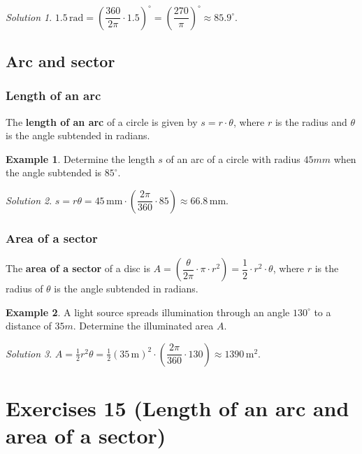 \documentclass[
  english,
  12pt,
  oneside]{book}
\theoremstyle{definition}
\theoremstyle{definition}
\newtheorem{example}{Example}[chapter]
\theoremstyle{definition}
\theoremstyle{definition}
\theoremstyle{remark}
\newtheorem*{solution}{Solution}
\begin{document}
\begin{solution}
\(1.5\,\mathrm{rad} = \left(\dfrac{360}{2\pi}\cdot 1.5\right)^\circ = \left(\dfrac{270}{\pi}\right)^\circ \approx 85.9^\circ\).
\end{solution}

\section{Arc and sector}\label{arc-and-sector}

\subsection{Length of an arc}\label{length-of-an-arc}

The \textbf{length of an arc} of a circle is given by \(s=r\cdot\theta\), where \(r\) is the radius and \(\theta\) is the angle subtended in radians.

\begin{example}
Determine the length \(s\) of an arc of a circle with radius \(45mm\) when the angle subtended is \(85^\circ\).
\end{example}

\begin{solution}
\(s=r\theta = 45\,\mathrm{mm}\cdot\left(\dfrac{2\pi}{360}\cdot 85\right) \approx 66.8\,\mathrm{mm}\).
\end{solution}

\subsection{Area of a sector}\label{area-of-a-sector}

The \textbf{area of a sector} of a disc is \(A=\left(\dfrac{\theta}{2\pi}\cdot\pi\cdot r^2\right) = \dfrac{1}{2}\cdot r^2\cdot \theta\), where \(r\) is the radius of \(\theta\) is the angle subtended in radians.

\begin{example}
A light source spreads illumination through an angle \(130^\circ\) to a distance of \(35m\). Determine the illuminated area \(A\).
\end{example}

\begin{solution}
\(A=\frac12 r^2\theta = \frac12\left(35\,\mathrm{m}\right)^2\cdot\left(\dfrac{2\pi}{360}\cdot 130\right) \approx 1390\,\mathrm{m}^2\).
\end{solution}

\chapter*{Exercises 15 (Length of an arc and area of a sector)}\label{exercises-15-length-of-an-arc-and-area-of-a-sector}
\end{document}
